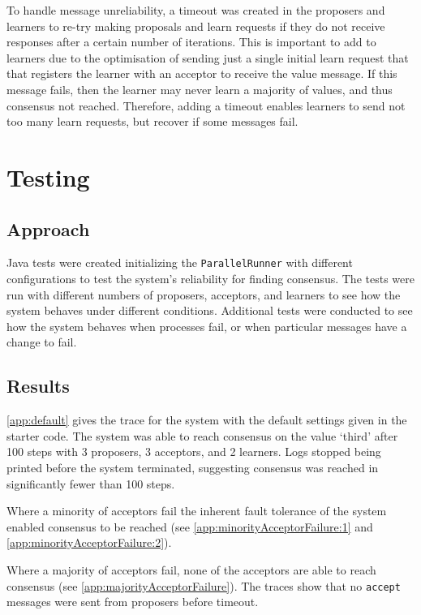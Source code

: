 \documentclass[a4paper, 12pt]{article}
\begin{document}
To handle message unreliability, a timeout was created in the proposers and learners to re-try making proposals and learn requests if they do not receive responses after a certain number of iterations. This is important to add to learners due to the optimisation of sending just a single initial learn request that that registers the learner with an acceptor to receive the value message. If this message fails, then the learner may never learn a majority of values, and thus consensus not reached. Therefore, adding a timeout enables learners to send not too many learn requests, but recover if some messages fail.

\section{Testing}

\subsection{Approach}

Java tests were created initializing the \texttt{ParallelRunner} with different configurations to test the system's reliability for finding consensus. The tests were run with different numbers of proposers, acceptors, and learners to see how the system behaves under different conditions. Additional tests were conducted to see how the system behaves when processes fail, or when particular messages have a change to fail.

\subsection{Results}

\autoref{app:default} gives the trace for the system with the default settings given in the starter code. The system was able to reach consensus on the value `third' after 100 steps with 3 proposers, 3 acceptors, and 2 learners. Logs stopped being printed before the system terminated, suggesting consensus was reached in significantly fewer than 100 steps.

Where a minority of acceptors fail the inherent fault tolerance of the system enabled consensus to be reached (see \autoref{app:minorityAcceptorFailure:1} and \autoref{app:minorityAcceptorFailure:2}).

Where a majority of acceptors fail, none of the acceptors are able to reach consensus (see \autoref{app:majorityAcceptorFailure}). The traces show that no \texttt{accept} messages were sent from proposers before timeout.
\end{document}
